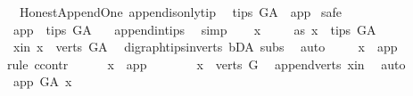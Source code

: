 \begin{isabellebody}
%
\endisatagproof
{\isafoldproof}%
%
\isadelimproof
\isanewline
%
\endisadelimproof
\isanewline
{}\isamarkupfalse%
\ {\isacharparenleft}{\kern0pt}\ Honest{\isacharunderscore}{\kern0pt}Append{\isacharunderscore}{\kern0pt}One{\isacharparenright}{\kern0pt}\ append{\isacharunderscore}{\kern0pt}is{\isacharunderscore}{\kern0pt}only{\isacharunderscore}{\kern0pt}tip{\isacharcolon}{\kern0pt}\isanewline
\ \ {\isachardoublequoteopen}tips\ G{\isacharunderscore}{\kern0pt}A\ {\isacharequal}{\kern0pt}\ {\isacharbraceleft}{\kern0pt}app{\isacharbraceright}{\kern0pt}{\isachardoublequoteclose}\isanewline
%
\isadelimproof
%
\endisadelimproof
%
\isatagproof
{}\isamarkupfalse%
\ safe\isanewline
\ \ \isamarkupfalse%
\ {\isachardoublequoteopen}app\ {\isasymin}\ tips\ G{\isacharunderscore}{\kern0pt}A\ {\isachardoublequoteclose}\ \isamarkupfalse%
\ append{\isacharunderscore}{\kern0pt}in{\isacharunderscore}{\kern0pt}tips\ \isamarkupfalse%
\ simp\isanewline
\ \ \isamarkupfalse%
\ x\ \isanewline
\ \ \isamarkupfalse%
\ as{}{\isacharcolon}{\kern0pt}\ {\isachardoublequoteopen}x\ {\isasymin}\ tips\ G{\isacharunderscore}{\kern0pt}A{\isachardoublequoteclose}\isanewline
\ \ \isamarkupfalse%
\ \isamarkupfalse%
\ x{\isacharunderscore}{\kern0pt}in{\isacharcolon}{\kern0pt}\ {\isachardoublequoteopen}x\ {\isasymin}\ verts\ G{\isacharunderscore}{\kern0pt}A{\isachardoublequoteclose}\ \isamarkupfalse%
\ digraph{\isachardot}{\kern0pt}tips{\isacharunderscore}{\kern0pt}in{\isacharunderscore}{\kern0pt}verts\ bD{\isacharunderscore}{\kern0pt}A\ subs\ \isamarkupfalse%
\ auto\ \isanewline
\ \ \isamarkupfalse%
\ {\isachardoublequoteopen}x\ {\isacharequal}{\kern0pt}\ app{\isachardoublequoteclose}\isanewline
\ \ \isamarkupfalse%
{\isacharparenleft}{\kern0pt}rule\ ccontr{\isacharparenright}{\kern0pt}\isanewline
\ \ \ \ \isamarkupfalse%
\ {\isachardoublequoteopen}x\ {\isasymnoteq}\ app{\isachardoublequoteclose}\isanewline
\ \ \ \ \isamarkupfalse%
\ \isamarkupfalse%
\ {\isachardoublequoteopen}x\ {\isasymin}\ verts\ G{\isachardoublequoteclose}\ \isamarkupfalse%
\ append{\isacharunderscore}{\kern0pt}verts\ x{\isacharunderscore}{\kern0pt}in\ \isamarkupfalse%
\ auto\isanewline
\ \ \ \ \isamarkupfalse%
\ \isamarkupfalse%
\ {\isachardoublequoteopen}app\ {\isasymrightarrow}\isactrlsup {\isacharplus}{\kern0pt}\isactrlbsub G{\isacharunderscore}{\kern0pt}A\isactrlesub \ x{\isachardoublequoteclose}\ \isamarkupfalse%

\end{isabellebody}
